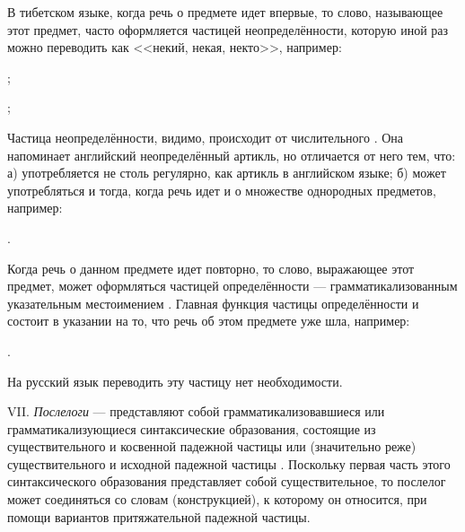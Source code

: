 В тибетском языке, когда речь о предмете идет впервые, то слово, называющее этот предмет, часто оформляется частицей неопределённости, которую иной раз можно переводить как <<некий, некая, некто>>, например:
\begin{prfsample}
	\item {};
	\item {};
\end{prfsample}

Частица неопределённости, видимо, происходит от числительного . Она напоминает английский неопределённый артикль, но отличается от него тем, что: а) употребляется не столь регулярно, как артикль в английском языке; б) может употребляться и тогда, когда речь идет и о множестве однородных предметов, например:
\begin{prfsample}
	\item {}.
\end{prfsample}

Когда речь о данном предмете идет повторно, то слово, выражающее этот предмет, может оформляться частицей определённости  --- грамматикализованным указательным местоимением . Главная функция частицы определённости и состоит в указании на то, что речь об этом предмете уже шла, например:
\begin{prfsample}
	\item {}.
\end{prfsample}
На русский язык переводить эту частицу нет необходимости.

VII. \emph{Послелоги} --- представляют собой грамматикализовавшиеся или грамматикализующиеся синтаксические образования, состоящие из существительного и косвенной падежной частицы или (значительно реже) существительного и исходной падежной частицы . Поскольку первая часть этого синтаксического образования представляет собой существительное, то послелог может соединяться со
словам (конструкцией), к которому он относится, при помощи вариантов притяжательной падежной частицы.

